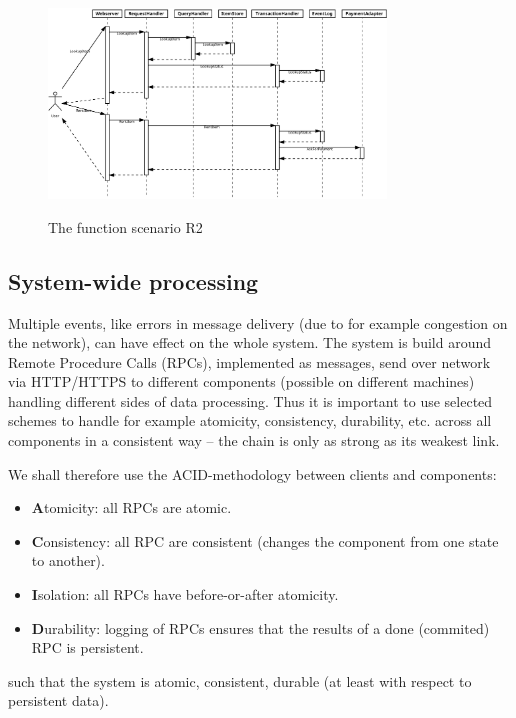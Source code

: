 \begin{figure}[ht]
    \centering
    \caption{The function scenario R2}
    \includegraphics[width=0.8\textwidth]{figures/r2-sequence}
    \label{fig:r2-sequence}
\end{figure}



\subsection{System-wide processing}
\label{sec:syst-wide-proc}
Multiple events, like errors in message delivery (due to for example congestion on the network), can have effect on the whole system.
The system is build around Remote Procedure Calls (RPCs), implemented as messages, send over network via HTTP/HTTPS to different components (possible on different machines) handling different sides of data processing. Thus it is important to use selected schemes to handle for example atomicity, consistency, durability, etc. across all components in a consistent way -- the chain is only as strong as its weakest link.

We shall therefore use the ACID-methodology between clients and components:
\begin{itemize}
    \item \textbf{A}tomicity: all RPCs are atomic.
    \item \textbf{C}onsistency: all RPC are consistent (changes the component from one state to another).
    \item \textbf{I}solation: all RPCs have before-or-after atomicity.
    \item \textbf{D}urability: logging of RPCs ensures that the results of a done (commited) RPC is persistent.
\end{itemize}
such that the system is atomic, consistent, durable (at least with respect to persistent data).

